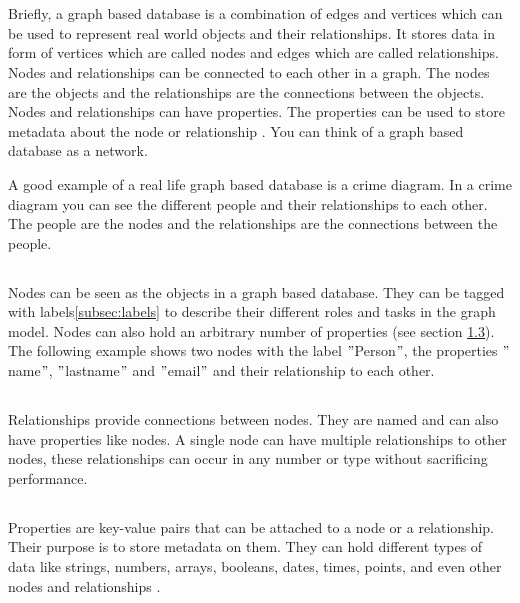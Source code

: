 
\section{}
Briefly, a graph based database is a combination of edges and vertices which  can be used to represent real world
objects and their relationships.
It stores data in form of vertices which are called nodes and edges which are called relationships.
Nodes and relationships can be connected to each other in a graph.
The nodes are the objects and the relationships are the connections between the objects.
Nodes and relationships can have properties.
The properties can be used to store metadata about the node or relationship \cite[P. 6f. ]{PractivalNeo4j}.
You can think of a graph based database as a network.

A good example of a real life graph based database is a crime diagram.
In a crime diagram you can see the different people and their relationships to each other.
The people are the nodes and the relationships are the connections between the people. \cite[compare P. 6f. ]{BeginningNeo4j}

\subsection{}
Nodes can be seen as the objects in a graph based database.
They can be tagged with labels\ref{subsec:labels} to describe their different roles and tasks in the graph model.
Nodes can also hold an arbitrary number of properties (see section \ref{subsec:tbd{properties}}).
The following example shows two nodes with the label \("\)Person\("\), the properties \("\)name\("\), \("\)lastname\("\)
and \("\)email\("\) and their relationship to each other\cite[compare P. 6f. ]{PractivalNeo4j}.
\subsection{}\label{subsec:tbd{relationships}}
Relationships provide connections between nodes.
They are named and can also have properties like nodes.
A single node can have multiple relationships to other nodes, these relationships can occur in any number or type without
sacrificing performance\cite[compare ]{Neo4j:allgemeines}.
\subsection{} \label{subsec:tbd{properties}}
Properties are key-value pairs that can be attached to a node or a relationship.
Their purpose is to store metadata on them.
They can hold different types of data like strings, numbers, arrays, booleans, dates, times, points, and even other nodes and relationships \cite[compare ]{neo4j:Values} \cite[compare]{neo4j:Graph}.
